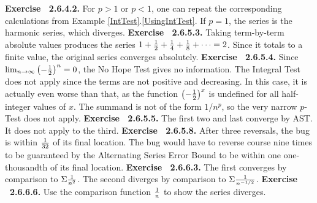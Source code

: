  {\noindent \protect \bf  Exercise ~2.6.4.2.} For $p>1$ or $p<1$, one can repeat the corresponding calculations from Example \protect \ref  {IntTest}.\protect \ref  {UsingIntTest}. If $p=1$, the series is the harmonic series, which diverges. \protect \newline  \protect \newline  
 {\noindent \protect \bf  Exercise ~2.6.5.3.} Taking term-by-term absolute values produces the series $1+\protect \frac  {1}{2}+\protect \frac  {1}{4}+\protect \frac  {1}{8}+\protect \cdots  =2$. Since it totals to a finite value, the original series converges absolutely. \protect \newline  \protect \newline  
 {\noindent \protect \bf  Exercise ~2.6.5.4.} \textbullet Since $\protect \qopname  \relax m{lim}_{n\to \infty }\left (-\protect \frac  {1}{2}\right )^n=0$, the No Hope Test gives no information. \textbullet The Integral Test does not apply since the terms are not positive and decreasing. In this case, it is actually even worse than that, as the function $\left (-\protect \frac  {1}{2}\right )^x$ is undefined for all half-integer values of $x$. \textbullet The summand is not of the form $1/n^p$, so the very narrow $p$-Test does not apply. \protect \newline  \protect \newline  
 {\noindent \protect \bf  Exercise ~2.6.5.5.} The first two and last converge by AST. It does not apply to the third. \protect \newline  \protect \newline  
 {\noindent \protect \bf  Exercise ~2.6.5.8.} After three reversals, the bug is within $\protect \frac  {1}{32}$ of its final location. The bug would have to reverse course nine times to be guaranteed by the Alternating Series Error Bound to be within one one-thousandth of its final location.  \protect \newline  \protect \newline  
 {\noindent \protect \bf  Exercise ~2.6.6.3.} The first converges by comparison to $\Sigma \protect \frac  {1}{n^2}$. The second diverges by comparison to $\Sigma \protect \frac  {1}{n^{-1/2}}$. \protect \newline  \protect \newline  
 {\noindent \protect \bf  Exercise ~2.6.6.6.} Use the comparison function $\protect \frac  {1}{n}$ to show the series diverges. \protect \newline  \protect \newline  
